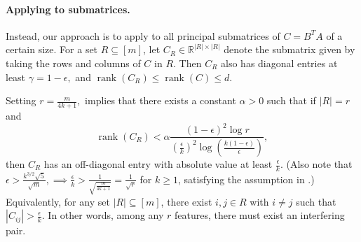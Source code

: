 \documentclass[11pt]{article}
\newcommand{\RR}{\mathbb{R}}
\DeclareMathOperator{\rank}{rank}
\begin{document}
\paragraph{Applying  to submatrices.} Instead, our approach is to apply  to all principal submatrices of $C=B^TA$ of a certain size. For a set $R\subseteq [m]$, let $C_R \in \RR^{|R|\times |R|}$ denote the submatrix given by taking the rows and columns of $C$ in $R$. Then $C_R$ also has diagonal entries at least $\gamma = 1 - \epsilon,$ and $\rank(C_R)\le \rank(C) \le d.$

Setting $r = \frac{m}{4k+1},$  implies that there exists a constant $\alpha > 0$ such that if $|R|=r$ and
\begin{equation}
    \rank(C_R) < \alpha \frac{(1 - \epsilon)^2\log r}{(\frac{\epsilon}{k})^2\log (\frac{k(1 - \epsilon)}{\epsilon})},
\end{equation}
then $C_R$ has an off-diagonal entry with absolute value at least $\frac{\epsilon}{k}.$ (Also note that $\epsilon > \frac{k^{3/2}\sqrt{5}}{\sqrt{m}}, \implies \frac{\epsilon}{k} > \frac{1}{\sqrt{\frac{m}{4k+1}}} = \frac{1}{\sqrt{r}}$ for $k\ge 1$, satisfying the assumption in .) Equivalently, for any set $|R|\subseteq [m]$, there exist $i,j\in R$ with $i\neq j$ such that $|C_{ij}| > \frac{\epsilon}{k}.$ In other words, among any $r$ features, there must exist an interfering pair.
\end{document}
